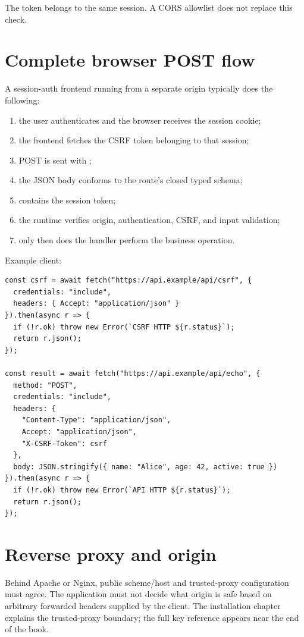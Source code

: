 The token belongs to the same session. A CORS allowlist does not replace this check.

\section{Complete browser POST flow}

A session-auth frontend running from a separate  origin typically does the following:

\begin{enumerate}
  \item the user authenticates and the browser receives the session cookie;
  \item the frontend fetches the CSRF token belonging to that session;
  \item POST is sent with ;
  \item the JSON body conforms to the route's closed typed schema;
  \item {} contains the session token;
  \item the runtime verifies origin, authentication, CSRF, and input validation;
  \item only then does the handler perform the business operation.
\end{enumerate}

Example client:

\begin{lstlisting}
const csrf = await fetch("https://api.example/api/csrf", {
  credentials: "include",
  headers: { Accept: "application/json" }
}).then(async r => {
  if (!r.ok) throw new Error(`CSRF HTTP ${r.status}`);
  return r.json();
});

const result = await fetch("https://api.example/api/echo", {
  method: "POST",
  credentials: "include",
  headers: {
    "Content-Type": "application/json",
    Accept: "application/json",
    "X-CSRF-Token": csrf
  },
  body: JSON.stringify({ name: "Alice", age: 42, active: true })
}).then(async r => {
  if (!r.ok) throw new Error(`API HTTP ${r.status}`);
  return r.json();
});
\end{lstlisting}

\section{Reverse proxy and origin}

Behind Apache or Nginx, public scheme/host and trusted-proxy configuration must agree. The application must not decide what origin is safe based on arbitrary forwarded headers supplied by the client. The installation chapter explains the trusted-proxy boundary; the full  key reference appears near the end of the book.

